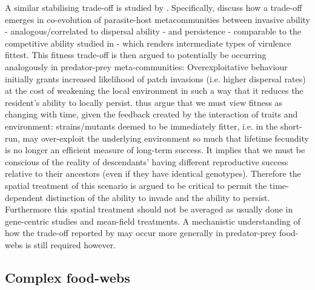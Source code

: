 \documentclass[a4paper]{report}
\begin{document}
A similar stabilising trade-off is studied by \citep{Goodnight2008}. Specifically, \citep{Goodnight2008} discuss how a trade-off emerges in co-evolution of parasite-host metacommunities between invasive ability - analogous/correlated to dispersal ability - and persistence - comparable to the competitive ability studied in \citep{Pillai2012} - which renders intermediate types of virulence fittest. This fitness trade-off is then argued to potentially be occurring analogously in predator-prey meta-communities: Overexploitative behaviour initially grants increased likelihood of patch invasions (i.e. higher dispersal rates) at the cost of weakening the local environment in such a way that it reduces the resident’s ability to locally persist. \citep{Goodnight2008} thus argue that we must view fitness as changing with time, given the feedback created by the interaction of traits and environment: strains/mutants deemed to be immediately fitter, i.e. in the short-run, may over-exploit the underlying environment so much that lifetime fecundity is no longer an efficient measure of long-term success. It implies that we must be conscious of the reality of descendants' having different reproductive success relative to their ancestors (even if they have identical genotypes). Therefore the spatial treatment of this scenario is argued to be critical to permit the time-dependent distinction of the ability to invade and the ability to persist. Furthermore this spatial treatment should not be averaged as usually done in gene-centric studies and mean-field treatments. A mechanistic understanding of how the trade-off reported by \citep{Goodnight2008} may occur more generally in predator-prey food-webs is still required however.\\

\subsection{Complex food-webs \label{sec:complex_foodwebs} }
\end{document}

